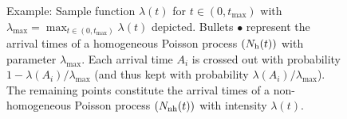 \begin{figure}[H]
\begin{center}
\caption{Example:
Sample function $\lambda(t)$ for $t \in (0, t_{\max})$ with $\lambda_{\max} = \max_{t \in (0, t_{\max})} \lambda(t)$ depicted.
Bullets $\bullet$ represent the arrival times of a homogeneous Poisson process $(N_{\rm h}(t))$ with parameter $\lambda_{\max}$.
Each arrival time $A_i$ is crossed out with probability $1 - \lambda(A_i)/\lambda_{\max}$ (and thus
kept with probability $\lambda(A_i)/\lambda_{\max}$). The remaining points constitute
the arrival times of a non-homogeneous Poisson process $(N_{\rm nh}(t))$ with intensity  $\lambda(t)$.}
\label{fig:non-hom_Poisson}
\end{center}
\end{figure}

